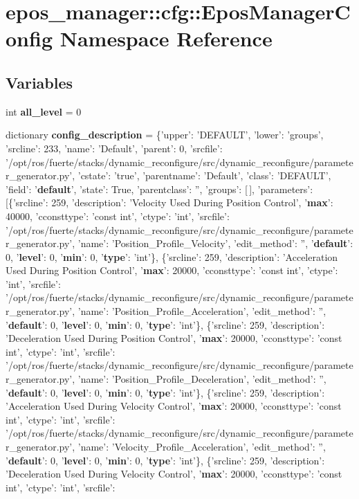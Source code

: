 \section{epos\-\_\-manager\-:\-:cfg\-:\-:\-Epos\-Manager\-Config \-Namespace \-Reference}
\label{namespaceepos__manager_1_1cfg_1_1EposManagerConfig}
\subsection*{\-Variables}
\begin{DoxyCompactItemize}
\item 
int {\bf all\-\_\-level} = 0
\item 
dictionary {\bf config\-\_\-description} = \{'upper'\-: '\-D\-E\-F\-A\-U\-L\-T', 'lower'\-: 'groups', 'srcline'\-: 233, 'name'\-: '\-Default', 'parent'\-: 0, 'srcfile'\-: '/opt/ros/fuerte/stacks/dynamic\-\_\-reconfigure/src/dynamic\-\_\-reconfigure/parameter\-\_\-generator.\-py', 'cstate'\-: 'true', 'parentname'\-: '\-Default', 'class'\-: '\-D\-E\-F\-A\-U\-L\-T', 'field'\-: '{\bf default}', 'state'\-: \-True, 'parentclass'\-: '', 'groups'\-: [$\,$], 'parameters'\-: [\{'srcline'\-: 259, 'description'\-: '\-Velocity \-Used \-During \-Position \-Control', '{\bf max}'\-: 40000, 'cconsttype'\-: 'const int', 'ctype'\-: 'int', 'srcfile'\-: '/opt/ros/fuerte/stacks/dynamic\-\_\-reconfigure/src/dynamic\-\_\-reconfigure/parameter\-\_\-generator.\-py', 'name'\-: '\-Position\-\_\-\-Profile\-\_\-\-Velocity', 'edit\-\_\-method'\-: '', '{\bf default}'\-: 0, '{\bf level}'\-: 0, '{\bf min}'\-: 0, '{\bf type}'\-: 'int'\}, \{'srcline'\-: 259, 'description'\-: '\-Acceleration \-Used \-During \-Position \-Control', '{\bf max}'\-: 20000, 'cconsttype'\-: 'const int', 'ctype'\-: 'int', 'srcfile'\-: '/opt/ros/fuerte/stacks/dynamic\-\_\-reconfigure/src/dynamic\-\_\-reconfigure/parameter\-\_\-generator.\-py', 'name'\-: '\-Position\-\_\-\-Profile\-\_\-\-Acceleration', 'edit\-\_\-method'\-: '', '{\bf default}'\-: 0, '{\bf level}'\-: 0, '{\bf min}'\-: 0, '{\bf type}'\-: 'int'\}, \{'srcline'\-: 259, 'description'\-: '\-Deceleration \-Used \-During \-Position \-Control', '{\bf max}'\-: 20000, 'cconsttype'\-: 'const int', 'ctype'\-: 'int', 'srcfile'\-: '/opt/ros/fuerte/stacks/dynamic\-\_\-reconfigure/src/dynamic\-\_\-reconfigure/parameter\-\_\-generator.\-py', 'name'\-: '\-Position\-\_\-\-Profile\-\_\-\-Deceleration', 'edit\-\_\-method'\-: '', '{\bf default}'\-: 0, '{\bf level}'\-: 0, '{\bf min}'\-: 0, '{\bf type}'\-: 'int'\}, \{'srcline'\-: 259, 'description'\-: '\-Acceleration \-Used \-During \-Velocity \-Control', '{\bf max}'\-: 20000, 'cconsttype'\-: 'const int', 'ctype'\-: 'int', 'srcfile'\-: '/opt/ros/fuerte/stacks/dynamic\-\_\-reconfigure/src/dynamic\-\_\-reconfigure/parameter\-\_\-generator.\-py', 'name'\-: '\-Velocity\-\_\-\-Profile\-\_\-\-Acceleration', 'edit\-\_\-method'\-: '', '{\bf default}'\-: 0, '{\bf level}'\-: 0, '{\bf min}'\-: 0, '{\bf type}'\-: 'int'\}, \{'srcline'\-: 259, 'description'\-: '\-Deceleration \-Used \-During \-Velocity \-Control', '{\bf max}'\-: 20000, 'cconsttype'\-: 'const int', 'ctype'\-: 'int', 'srcfile'\-: 
\end{DoxyCompactItemize}
